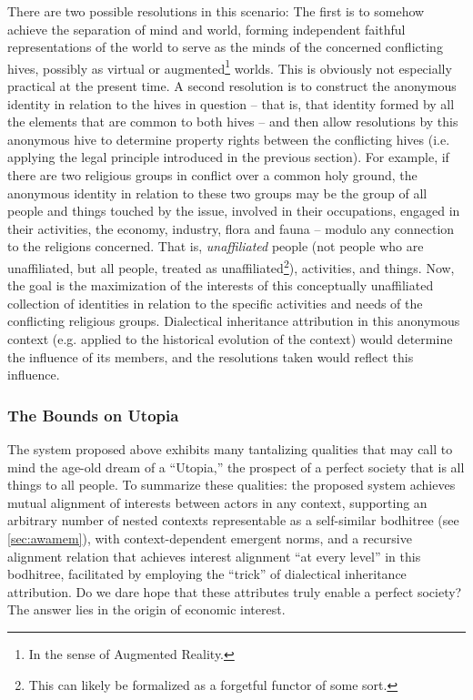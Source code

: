 \documentclass[pra,twocolumn,groupedaddress,10pt]{revtex4}
\theoremstyle{definition}
\begin{document}
There are two possible resolutions in this scenario: The first is to somehow achieve the separation of mind and world, forming independent faithful representations of the world to serve as the minds of the concerned conflicting hives, possibly as virtual or augmented\footnote{In the sense of Augmented Reality.} worlds. This is obviously not especially practical at the present time. A second resolution is to construct the anonymous identity in relation to the hives in question -- that is, that identity formed by all the elements that are common to both hives -- and then allow resolutions by this anonymous hive to determine property rights between the conflicting hives (i.e. applying the legal principle introduced in the previous section). For example, if there are two religious groups in conflict over a common holy ground, the anonymous identity in relation to these two groups may be the group of all people and things touched by the issue, involved in their occupations, engaged in their activities, the economy, industry, flora and fauna -- modulo any connection to the religions concerned. That is, \textit{unaffiliated} people (not people who are unaffiliated, but all people, treated as unaffiliated\footnote{This can likely be formalized as a forgetful functor of some sort.}), activities, and things. Now, the goal is the maximization of the interests of this conceptually unaffiliated collection of identities in relation to the specific activities and needs of the conflicting religious groups. Dialectical inheritance attribution in this anonymous context (e.g. applied to the historical evolution of the context) would determine the influence of its members, and the resolutions taken would reflect this influence.


\subsubsection{The Bounds on Utopia}

The system proposed above exhibits many tantalizing qualities that may call to mind the age-old dream of a ``Utopia,'' the prospect of a perfect society that is all things to all people. To summarize these qualities: the proposed system achieves mutual alignment of interests between actors in any context, supporting an arbitrary number of nested contexts representable as a self-similar bodhitree (see \autoref{sec:awamem}), with context-dependent emergent norms, and a recursive alignment relation that achieves interest alignment ``at every level'' in this bodhitree, facilitated by employing the ``trick'' of dialectical inheritance attribution. Do we dare hope that these attributes truly enable a perfect society? The answer lies in the origin of economic interest.
\end{document}
